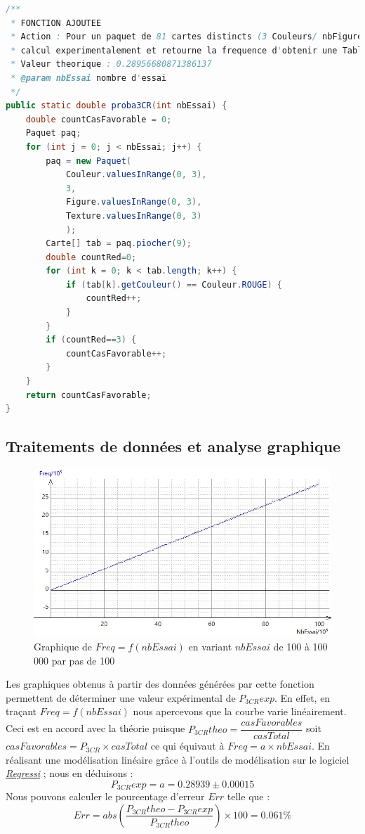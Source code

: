 \documentclass{report}
\begin{document}
\begin{lstlisting}[language=java, caption={\it Fonction proba3CR}, label=codeProba3CR]
/**
 * FONCTION AJOUTEE
 * Action : Pour un paquet de 81 cartes distincts (3 Couleurs/ nbFiguresMax=3/ 3 Figures/ 3 Textures possibles par carte) : 
 * calcul experimentalement et retourne la frequence d'obtenir une Table (arrangement de 9 cartes distincts parmi les 81 du Paquet) contenant exactement 3 Cartes Rouges.
 * Valeur theorique : 0.28956680871386137
 * @param nbEssai nombre d'essai
 */
public static double proba3CR(int nbEssai) {
    double countCasFavorable = 0;
    Paquet paq;
    for (int j = 0; j < nbEssai; j++) {
        paq = new Paquet(
            Couleur.valuesInRange(0, 3), 
            3, 
            Figure.valuesInRange(0, 3), 
            Texture.valuesInRange(0, 3)
            );
        Carte[] tab = paq.piocher(9);
        double countRed=0;
        for (int k = 0; k < tab.length; k++) {
            if (tab[k].getCouleur() == Couleur.ROUGE) {
                countRed++;
            }
        }
        if (countRed==3) {
            countCasFavorable++;
        }
    }
    return countCasFavorable;
}
\end{lstlisting}



\subsection{Traitements de données et analyse graphique}
\begin{figure}[H]
	\includegraphics[width=\textwidth]{../graphe/Freq(n).jpg}
	\caption{Graphique de $Freq=f(nbEssai)$ en variant $nbEssai$ de 100 à 100 000 par pas de 100}
\end{figure}	
\bigskip

Les graphiques obtenus à partir des données générées par cette fonction permettent de déterminer une valeur expérimental de $P_{3CR}exp$. En effet, en traçant $Freq=f(nbEssai)$ nous apercevons que la courbe varie linéairement. Ceci est en accord avec la théorie puisque $P_{3CR}theo = \dfrac{casFavorables}{casTotal}$ soit $casFavorables = P_{3CR}\times casTotal$ ce qui équivaut à  $Freq=a\times nbEssai$. En réalisant une modélisation linéaire grâce à l'outils de modélisation sur le logiciel \href{https://regressi.fr/WordPress/}{\it \underline{Regressi}} ; nous en déduisons : 
$$P_{3CR}exp = a = 0.28939 \pm 0.00015$$
Nous pouvons calculer le pourcentage d'erreur $Err$ telle que :
$$Err = abs\left(\dfrac{P_{3CR}theo - P_{3CR}exp}{P_{3CR}theo}\right) \times100 = 0.061\%$$	
\end{document}
